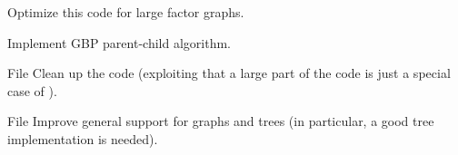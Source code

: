 \begin{DoxyRefList}
Optimize this code for large factor graphs. 



Implement GBP parent-\/child algorithm.  
\item[File \doxylink{treeep_8h}{treeep.h} ]\label{todo__todo000017}%
%
Clean up the  code (exploiting that a large part of the code is just a special case of ).  
\item[File \doxylink{weightedgraph_8h}{weightedgraph.h} ]\label{todo__todo000020}%
%
Improve general support for graphs and trees (in particular, a good tree implementation is needed). 
\end{DoxyRefList}